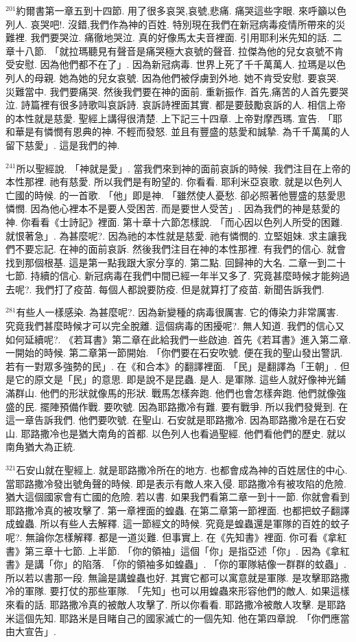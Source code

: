 \documentclass{book}
\begin{document}
$^{201}$約爾書第一章五到十四節.
用了很多哀哭,哀號,悲痛.
痛哭這些字眼.
來呼籲以色列人.
哀哭吧!.
沒錯,我們作為神的百姓.
特別現在我們在新冠病毒疫情所帶來的災難裡.
我們要哭泣.
痛徹地哭泣.
真的好像馬太夫音裡面.
引用耶利米先知的話.
二章十八節.
「就拉瑪聽見有聲音是痛哭極大哀號的聲音.
拉傑為他的兒女哀號不肯受安慰.
因為他們都不在了」.
因為新冠病毒.
世界上死了千千萬萬人.
拉瑪是以色列人的母親.
她為她的兒女哀號.
因為他們被俘虜到外地.
她不肯受安慰.
要哀哭.
災難當中.
我們要痛哭.
然後我們要在神的面前.
重新振作.
首先,痛苦的人首先要哭泣.
詩篇裡有很多詩歌叫哀訴詩.
哀訴詩裡面其實.
都是要鼓勵哀訴的人.
相信上帝的本性就是慈愛.
聖經上講得很清楚.
上下記三十四章.
上帝對摩西瑪.
宣告.
「耶和華是有憐憫有恩典的神.
不輕而發怒.
並且有豐盛的慈愛和誠摯.
為千千萬萬的人留下慈愛」.
這是我們的神.

$^{241}$所以聖經說.
「神就是愛」.
當我們來到神的面前哀訴的時候.
我們注目在上帝的本性那裡.
祂有慈愛.
所以我們是有盼望的.
你看看.
耶利米亞哀歌.
就是以色列人亡國的時候.
的一首歌.
「他」即是神.
「雖然使人憂愁.
卻必照著他豐盛的慈愛思憐憫.
因為他心裡本不是要人受困苦.
而是要世人受苦」.
因為我們的神是慈愛的神.
你看看《士詩記》裡面.
第十章十六節怎樣說.
「而心因以色列人所受的困難.
就恨著急」.
為甚麼呢?.
因為祂的本性就是慈愛.
祂有憐憫的.
立堅姐妹.
求主讓我們不要忘記.
在神的面前哀訴.
然後我們注目在神的本性那裡.
有我們的信心.
就會找到那個根基.
這是第一點我跟大家分享的.
第二點.
回歸神的大名.
二章一到二十七節.
持續的信心.
新冠病毒在我們中間已經一年半又多了.
究竟甚麼時候才能夠過去呢?.
我們打了疫苗.
每個人都說要防疫.
但是就算打了疫苗.
新聞告訴我們.

$^{281}$有些人一樣感染.
為甚麼呢?.
因為新變種的病毒很厲害.
它的傳染力非常厲害.
究竟我們甚麼時候才可以完全脫離.
這個病毒的困擾呢?.
無人知道.
我們的信心又如何延續呢?.
《若耳書》第二章在此給我們一些啟迪.
首先《若耳書》進入第二章.
一開始的時候.
第二章第一節開始.
「你們要在石安吹號.
便在我的聖山發出警訊.
若有一對眾多強勢的民」.
在《和合本》的翻譯裡面.
「民」是翻譯為「王朝」.
但是它的原文是「民」的意思.
即是說不是昆蟲.
是人.
是軍隊.
這些人就好像神光鋪滿群山.
他們的形狀就像馬的形狀.
戰馬怎樣奔跑.
他們也會怎樣奔跑.
他們就像強盛的民.
擺陣預備作戰.
要吹號.
因為耶路撒冷有難.
要有戰爭.
所以我們發覺到.
在這一章告訴我們.
他們要吹號.
在聖山.
石安就是耶路撒冷.
因為耶路撒冷是在石安山.
耶路撒冷也是猶大南角的首都.
以色列人也看過聖經.
他們看他們的歷史.
就以南角猶大為正統.

$^{321}$石安山就在聖經上.
就是耶路撒冷所在的地方.
也都會成為神的百姓居住的中心.
當耶路撒冷發出號角聲的時候.
即是表示有敵人來入侵.
耶路撒冷有被攻陷的危險.
猶大這個國家會有亡國的危險.
若以書.
如果我們看第二章一到十一節.
你就會看到耶路撒冷真的被攻擊了.
第一章裡面的蝗蟲.
在第二章第一節裡面.
也都把蚊子翻譯成蝗蟲.
所以有些人去解釋.
這一節經文的時候.
究竟是蝗蟲還是軍隊的百姓的蚊子呢?.
無論你怎樣解釋.
都是一道災難.
但事實上.
在《先知書》裡面.
你可看《拿紅書》第三章十七節.
上半節.
「你的領袖」這個「你」是指亞述「你」.
因為《拿紅書》是講「你」的陷落.
「你的領袖多如蝗蟲」.
「你的軍隊結像一群群的蚊蟲」.
所以若以書那一段.
無論是講蝗蟲也好.
其實它都可以寓意就是軍隊.
是攻擊耶路撒冷的軍隊.
要打仗的那些軍隊.
「先知」也可以用蝗蟲來形容他們的敵人.
如果這樣來看的話.
耶路撒冷真的被敵人攻擊了.
所以你看看.
耶路撒冷被敵人攻擊.
是耶路米這個先知.
耶路米是目睹自己的國家滅亡的一個先知.
他在第四章說.
「你們應當由大宣告」.
\end{document}
